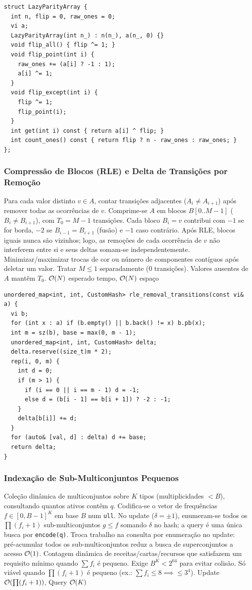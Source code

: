 \begin{lstlisting}
struct LazyParityArray {
  int n, flip = 0, raw_ones = 0;
  vi a;
  LazyParityArray(int n_) : n(n_), a(n_, 0) {}
  void flip_all() { flip ^= 1; }
  void flip_point(int i) {
    raw_ones += (a[i] ? -1 : 1);
    a[i] ^= 1;
  }
  void flip_except(int i) {
    flip ^= 1;
    flip_point(i);
  }
  int get(int i) const { return a[i] ^ flip; }
  int count_ones() const { return flip ? n - raw_ones : raw_ones; }
};
\end{lstlisting}

\subsubsection{Compressão de Blocos (RLE) e Delta de Transições por Remoção}
\algobox
  {Para cada valor distinto $v \in A$, contar transições adjacentes ($A_i \neq A_{i+1}$) após remover todas as ocorrências de $v$.}
  {Comprime-se $A$ em blocos $B[0..M-1]$ ($B_i \neq B_{i+1}$), com $T_0 = M - 1$ transições. Cada bloco $B_i = v$ contribui com $-1$ se for borda, $-2$ se $B_{i-1} = B_{i+1}$ (fusão) e $-1$ caso contrário.}
  {Após RLE, blocos iguais nunca são vizinhos; logo, as remoções de cada ocorrência de $v$ não interferem entre si e seus deltas somam-se independentemente.}
  {Minimizar/maximizar trocas de cor ou número de componentes contíguos após deletar um valor.}
  {Tratar $M \le 1$ separadamente ($0$ transições). Valores ausentes de $A$ mantêm $T_0$.}
  {$\mathcal{O}(N)$ esperado tempo, $\mathcal{O}(N)$ espaço}

\begin{lstlisting}
unordered_map<int, int, CustomHash> rle_removal_transitions(const vi& a) {
  vi b;
  for (int x : a) if (b.empty() || b.back() != x) b.pb(x);
  int m = sz(b), base = max(0, m - 1);
  unordered_map<int, int, CustomHash> delta;
  delta.reserve((size_t)m * 2);
  rep(i, 0, m) {
    int d = 0;
    if (m > 1) {
      if (i == 0 || i == m - 1) d = -1;
      else d = (b[i - 1] == b[i + 1]) ? -2 : -1;
    }
    delta[b[i]] += d;
  }
  for (auto& [val, d] : delta) d += base;
  return delta;
}
\end{lstlisting}

\subsubsection{Indexação de Sub-Multiconjuntos Pequenos}
\algobox
  {Coleção dinâmica de multiconjuntos sobre $K$ tipos (multiplicidades $< B$), consultando quantos ativos contêm $q$.}
  {Codifica-se o vetor de frequências $f \in [0, B-1]^K$ em base $B$ num \texttt{ull}. No update ($\delta = \pm 1$), enumeram-se todos os $\prod (f_i + 1)$ sub-multiconjuntos $g \le f$ somando $\delta$ no hash; a query é uma única busca por \texttt{encode(q)}.}
  {Troca trabalho na consulta por enumeração no update: pré-acumular todos os sub-multiconjuntos reduz a busca de superconjuntos a acesso $\mathcal{O}(1)$.}
  {Contagem dinâmica de receitas/cartas/recursos que satisfazem um requisito mínimo quando $\sum f_i$ é pequeno.}
  {Exige $B^K < 2^{64}$ para evitar colisão. Só viável quando $\prod (f_i + 1)$ é pequeno (ex.: $\sum f_i \le 8 \implies \le 3^4$).}
  {Update $\mathcal{O}(\prod (f_i + 1))$, Query $\mathcal{O}(K)$}


